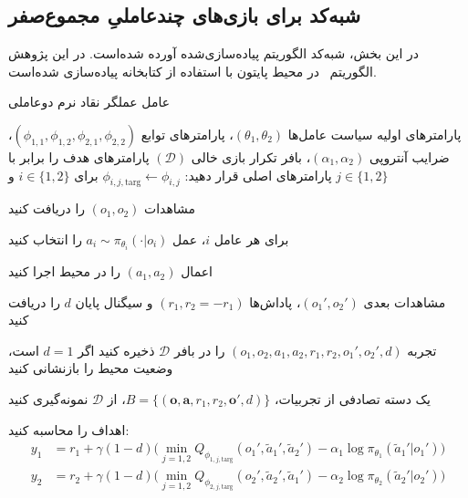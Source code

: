 \subsection{شبه‌کد  برای بازی‌های چندعاملیِ مجموع­‌صفر}

در این بخش، شبه‌کد الگوریتم  پیاده‌سازی‌شده آورده شده‌است. در این پژوهش الگوریتم~ در محیط پایتون با استفاده از کتابخانه  \cite{paszke2017automatic} پیاده‌سازی شده‌است.

\begin{algorithm}[H]
    \caption{عامل عملگر نقاد نرم دو­عاملی}\label{alg:MASAC}
    \begin{algorithmic}[1]
         پارامترهای اولیه سیاست عامل‌ها $(\theta_1, \theta_2)$، پارامترهای توابع  $(\phi_{1,1}, \phi_{1,2}, \phi_{2,1}, \phi_{2,2})$، ضرایب آنتروپی $(\alpha_1, \alpha_2)$، بافر تکرار بازی خالی $(\mathcal{D})$
        \State پارامترهای هدف را برابر با پارامترهای اصلی قرار دهید: 
        \Statex \hspace{\algorithmicindent}
        $\phi_{i,j,\text{targ}} \leftarrow \phi_{i,j}$ برای $i \in \{1, 2\}$ و $j \in \{1, 2\}$
        
            \State \parbox[t]{\dimexpr\linewidth-\algorithmicindent}{
            مشاهدات $(o_1, o_2)$ را دریافت کنید
            \strut}
            \State \parbox[t]{\dimexpr\linewidth-\algorithmicindent}{
            برای هر عامل $i$، عمل $a_i \sim \pi_{\theta_i}(\cdot|o_i)$ را انتخاب کنید
            \strut}
            \State اعمال $(a_1, a_2)$ را در محیط اجرا کنید
            \State \parbox[t]{\dimexpr\linewidth-\algorithmicindent}{
            مشاهدات بعدی $(o_1', o_2')$، پاداش‌ها $(r_1, r_2=-r_1)$ و سیگنال پایان $d$ را دریافت کنید
            \strut}
            \State تجربه $(o_1, o_2, a_1, a_2, r_1, r_2, o_1', o_2', d)$ را در بافر $\mathcal{D}$ ذخیره کنید
            \State اگر $d=1$ است، وضعیت محیط را بازنشانی کنید
            
                    \State \parbox[t]{\dimexpr\linewidth-\algorithmicindent}{
                    یک دسته تصادفی از تجربیات، $B = \{(\boldsymbol{o}, \boldsymbol{a}, r_1, r_2, \boldsymbol{o}', d)\}$، از $\mathcal{D}$ نمونه‌گیری کنید
                    \strut}
                    \State اهداف را محاسبه کنید:
                     \vspace{-15pt}
                    \begin{align*}
                        y_1 &= r_1 + \gamma (1-d) \Big(\min_{j=1,2} Q_{\phi_{1,j,\text{targ}}}(o_1', \tilde{a}_1', \tilde{a}_2') - \alpha_1 \log \pi_{\theta_1}(\tilde{a}_1'|o_1') \Big) \\
                        y_2 &= r_2 + \gamma (1-d) \Big(\min_{j=1,2} Q_{\phi_{2,j,\text{targ}}}(o_2', \tilde{a}_2', \tilde{a}_1') - \alpha_2 \log \pi_{\theta_2}(\tilde{a}_2'|o_2') \Big)
                    \end{align*}
                    \vspace{-35pt}
                    

\end{algorithmic}
\end{algorithm}
